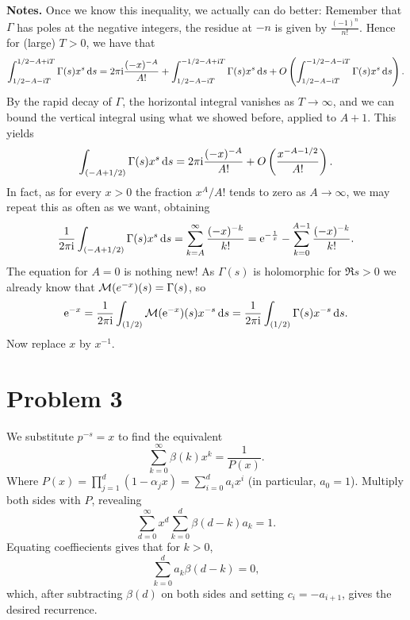 \documentclass[a4paper,11pt]{article}
\begin{document}
\textbf{Notes.}
Once we know this inequality, we actually can do better: Remember that $\Gamma$ has poles at
the negative integers, the residue at $-n$ is given by $\tfrac{(-1)^n}{n!}$. Hence for 
(large) $T > 0$, we have that 
\[
    \int_{1/2-A-\mathrm i T}^{1/2 - A +\mathrm i T} \Gamma(s) x^s \mathrm{\,d} s =
    2 \pi \mathrm i \frac{(-x)^{-A}}{A!} + \int_{1/2-A-\mathrm i T}^{-1/2 - A + \mathrm i T} \Gamma(s) x^s
    \mathrm{\,d} s + O\left( \int_{1/2-A-\mathrm i T}^{-1/2-A - \mathrm i T}  \Gamma(s) x^s \mathrm{\,d} s\right). 
\]
By the rapid decay of $\Gamma$, the horizontal integral vanishes as $T
\rightarrow \infty$, and we can bound the vertical integral using what we
showed before, applied to $A+1$. This yields
\[
    \int_{(-A+1/2)} \Gamma(s) x^s \mathrm{\,d} s = 2 \pi \mathrm i \frac{(-x)^{-A}}{A!} + O\left(\frac{x^{-A-1/2}}{A!}\right).
\]
In fact, as for every $x>0$ the fraction $x^A/A!$ tends to zero as $A \to \infty$, we
may repeat this as often as we want, obtaining
\[
    \frac 1{2 \pi \mathrm i} \int_{(-A+1/2)} \Gamma(s) x^s \mathrm{\,d} s = \sum_{k=A}^\infty \frac{(-x)^{-k}}{k!} 
    = \mathrm e^{-\frac 1x} - \sum_{k=0}^{A-1} \frac{(-x)^{-k}}{k!}.
\]
The equation for $A= 0$ is nothing new! As $\Gamma(s)$ is holomorphic
for $\Re s > 0$ we already know that $\mathcal{M}(e^{-x})(s) = \Gamma(s)$, so
\[
    \mathrm e^{-x} = \frac{1}{2 \pi \mathrm i} \int_{(1/2)} \mathcal{M}(\mathrm e^{-x})(s) x^{-s} \mathrm{\,d} s
    = \frac{1}{2 \pi \mathrm i} \int_{(1/2)} \Gamma(s) x^{-s} \mathrm{\,d} s.
\]
Now replace $x$ by $x^{-1}$. 

\section*{Problem 3}
We substitute $p^{-s} = x$ to find the equivalent
\[
    \sum_{k=0}^\infty \beta(k) x^k = \frac 1 {P(x)}. 
\]
Where $P(x) = \prod_{j=1}^d(1-\alpha_j x)= \sum_{i = 0}^d a_i x^i$ (in particular,
$a_0 = 1$). Multiply both sides with $P$, revealing
\[
    \sum_{d=0}^\infty x^d \sum_{k=0}^d \beta(d-k) a_k = 1.
\]
Equating coeffiecients gives that for $k>0$, 
\[
    \sum_{k=0}^d a_k \beta(d-k) = 0,
\]
which, after subtracting $\beta(d)$ on both sides and setting $c_i = -a_{i+1}$,
gives the desired recurrence.

\contactend
\end{document}
